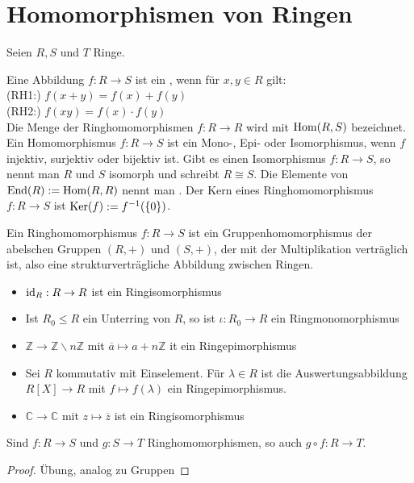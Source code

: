 \section{Homomorphismen von Ringen}

Seien $R,S$ und $T$ Ringe.

\begin{definition}[Ringhomomorphismus]
	Eine Abbildung $f:R\to S$ ist ein , wenn für $x,y\in R$ 
	gilt: \\
	(RH1:) $f(x+y)=f(x)+f(y)$ \\
	(RH2:) $f(xy)=f(x)\cdot f(y)$ \\
	Die Menge der Ringhomomorphismen $f:R\to R$ wird mit $\operatorname{Hom}(R,S)$ bezeichnet. Ein Homomorphismus $f:R\to S$ ist ein 
	Mono-, Epi- oder Isomorphismus, wenn $f$ injektiv, surjektiv oder bijektiv ist. Gibt es einen Isomorphismus 
	$f:R\to S$, so nennt man $R$ und $S$ isomorph und schreibt $R\cong S$. Die Elemente von $\operatorname{End}(R):= \operatorname{Hom}(R,R)$ nennt 
	man . Der Kern eines Ringhomomorphismus $f:R\to S$ ist $\operatorname{Ker}(f):= f^{-1}(\{0\})$.
\end{definition}

\begin{remark}
	Ein Ringhomomorphismus $f:R\to S$ ist ein Gruppenhomomorphismus der abelschen Gruppen $(R,+)$ und 
	$(S,+)$, der mit der Multiplikation verträglich ist, also eine strukturverträgliche Abbildung zwischen Ringen.
\end{remark}

\begin{example}
	\begin{itemize}
		\item $\operatorname{id}_R:R\to R$ ist ein Ringisomorphismus
		\item Ist $R_0\le R$ ein Unterring von $R$, so ist $\iota: R_0 \to R$ ein Ringmonomorphismus
		\item $\mathbb Z \to \mathbb Z\backslash n\mathbb Z$ mit $\overline a\mapsto a+n\mathbb Z$ it ein Ringepimorphismus
		\item Sei $R$ kommutativ mit Einselement. Für $\lambda\in R$ ist die Auswertungsabbildung $R[X]\to R$ mit $f\mapsto 
		f(\lambda)$ ein Ringepimorphismus.
		\item $\mathbb C \to \mathbb C$ mit $z\mapsto \overline z$ ist ein Ringisomorphismus
	\end{itemize}
\end{example}

\begin{proposition}
	Sind $f:R\to S$ und $g:S\to T$ Ringhomomorphismen, so auch $g\circ f:R\to T$.
\end{proposition}
\begin{proof}
	Übung, analog zu Gruppen
\end{proof}

